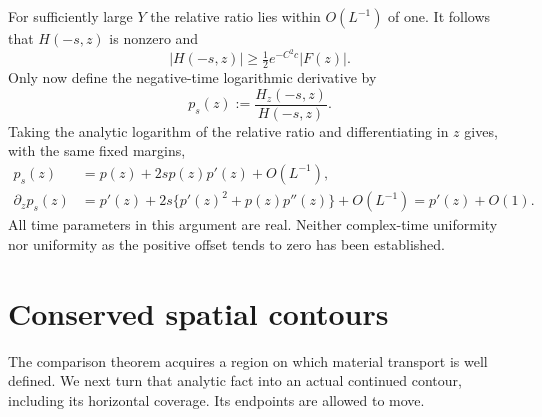\documentclass[11pt]{article}
\theoremstyle{remark}
\begin{document}
For sufficiently large $Y$ the relative ratio lies within $O(L^{-1})$
of one.  It follows that $H(-s,z)$ is nonzero and
\[
 |H(-s,z)|\ge\tfrac12 e^{-C^2c}|F(z)|.
\]
Only now define the negative-time logarithmic derivative by
\begin{equation}\label{scf-ps-definition}
 p_s(z):=\frac{H_z(-s,z)}{H(-s,z)}.
\end{equation}
Taking the analytic logarithm of the relative ratio and differentiating
in $z$ gives, with the same fixed margins,
\begin{align}
 p_s(z)&=p(z)+2sp(z)p'(z)+O(L^{-1}),\label{scf-ps-estimate}\\
 \partial_zp_s(z)&=p'(z)+2s\{p'(z)^2+p(z)p''(z)\}+O(L^{-1})
                  =p'(z)+O(1).\label{scf-ps-derivative}
\end{align}
All time parameters in this argument are real.  Neither complex-time
uniformity nor uniformity as the positive offset tends to zero has been
established.

\section{Conserved spatial contours}
\label{sec:scf-contours}

The comparison theorem acquires a region on which material transport is
well defined.  We next turn that analytic fact into an actual continued
contour, including its horizontal coverage.  Its endpoints are allowed
to move.
\end{document}
